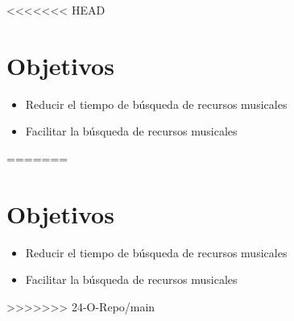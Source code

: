 <<<<<<< HEAD

\section*{Objetivos}

\begin{itemize}
	\item Reducir el tiempo de búsqueda de recursos musicales
	\item Facilitar la búsqueda de recursos musicales
\end{itemize}




=======

\section*{Objetivos}

\begin{itemize}
	\item Reducir el tiempo de búsqueda de recursos musicales
	\item Facilitar la búsqueda de recursos musicales
\end{itemize}




>>>>>>> 24-O-Repo/main
